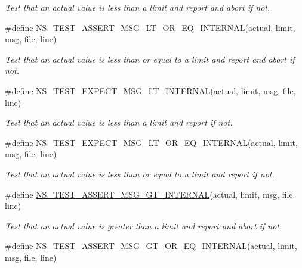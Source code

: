 \begin{DoxyCompactItemize}
\begin{DoxyCompactList}\small\item\em Test that an actual value is less than a limit and report and abort if not. \end{DoxyCompactList}\item 
\#define \hyperlink{group__testingimpl_ga7f276bcecced206bfd26813ac5c9a967}{N\+S\+\_\+\+T\+E\+S\+T\+\_\+\+A\+S\+S\+E\+R\+T\+\_\+\+M\+S\+G\+\_\+\+L\+T\+\_\+\+O\+R\+\_\+\+E\+Q\+\_\+\+I\+N\+T\+E\+R\+N\+AL}(actual,  limit,  msg,  file,  line)
\begin{DoxyCompactList}\small\item\em Test that an actual value is less than or equal to a limit and report and abort if not. \end{DoxyCompactList}\item 
\#define \hyperlink{group__testingimpl_ga73d8db2f2a288409abbd267fc31b2e00}{N\+S\+\_\+\+T\+E\+S\+T\+\_\+\+E\+X\+P\+E\+C\+T\+\_\+\+M\+S\+G\+\_\+\+L\+T\+\_\+\+I\+N\+T\+E\+R\+N\+AL}(actual,  limit,  msg,  file,  line)
\begin{DoxyCompactList}\small\item\em Test that an actual value is less than a limit and report if not. \end{DoxyCompactList}\item 
\#define \hyperlink{group__testingimpl_ga249245c784a56a7dbd704bc1d98b6873}{N\+S\+\_\+\+T\+E\+S\+T\+\_\+\+E\+X\+P\+E\+C\+T\+\_\+\+M\+S\+G\+\_\+\+L\+T\+\_\+\+O\+R\+\_\+\+E\+Q\+\_\+\+I\+N\+T\+E\+R\+N\+AL}(actual,  limit,  msg,  file,  line)
\begin{DoxyCompactList}\small\item\em Test that an actual value is less than or equal to a limit and report if not. \end{DoxyCompactList}\item 
\#define \hyperlink{group__testingimpl_gac0702d4efc2f4d35963c5da2d6fa2c98}{N\+S\+\_\+\+T\+E\+S\+T\+\_\+\+A\+S\+S\+E\+R\+T\+\_\+\+M\+S\+G\+\_\+\+G\+T\+\_\+\+I\+N\+T\+E\+R\+N\+AL}(actual,  limit,  msg,  file,  line)
\begin{DoxyCompactList}\small\item\em Test that an actual value is greater than a limit and report and abort if not. \end{DoxyCompactList}\item 
\#define \hyperlink{group__testingimpl_gaf962c2cdf0c9e474ac74427146594e59}{N\+S\+\_\+\+T\+E\+S\+T\+\_\+\+A\+S\+S\+E\+R\+T\+\_\+\+M\+S\+G\+\_\+\+G\+T\+\_\+\+O\+R\+\_\+\+E\+Q\+\_\+\+I\+N\+T\+E\+R\+N\+AL}(actual,  limit,  msg,  file,  line)

\end{DoxyCompactItemize}
